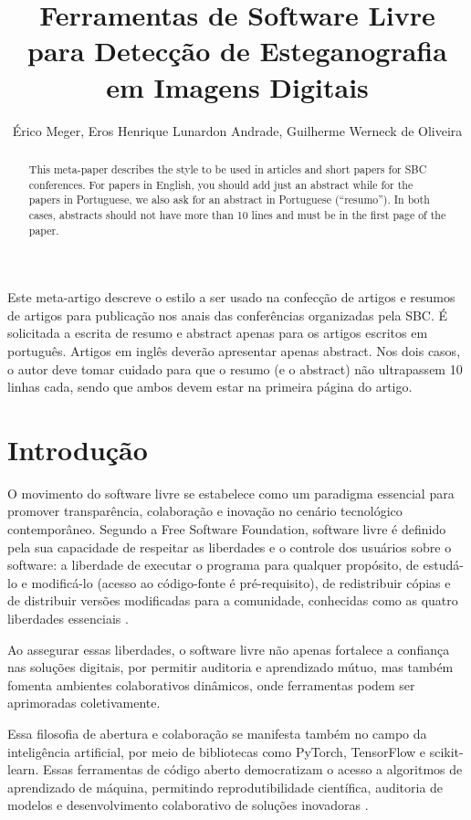 \documentclass[12pt]{article}
\title{Ferramentas de Software Livre para Detecção de Esteganografia em Imagens Digitais}
\author{Érico Meger\inst{1}, Eros Henrique Lunardon Andrade\inst{1}, Guilherme Werneck de Oliveira\inst{1}}
\begin{document}
\maketitle

\begin{abstract}
  This meta-paper describes the style to be used in articles and short papers
  for SBC conferences. For papers in English, you should add just an abstract
  while for the papers in Portuguese, we also ask for an abstract in
  Portuguese (``resumo''). In both cases, abstracts should not have more than
  10 lines and must be in the first page of the paper.
\end{abstract}

\begin{resumo}
  Este meta-artigo descreve o estilo a ser usado na confecção de artigos e
  resumos de artigos para publicação nos anais das conferências organizadas
  pela SBC. É solicitada a escrita de resumo e abstract apenas para os artigos
  escritos em português. Artigos em inglês deverão apresentar apenas abstract.
  Nos dois casos, o autor deve tomar cuidado para que o resumo (e o abstract)
  não ultrapassem 10 linhas cada, sendo que ambos devem estar na primeira
  página do artigo.
\end{resumo}

\section{Introdução}

O movimento do software livre se estabelece como um paradigma essencial para
promover transparência, colaboração e inovação no cenário tecnológico
contemporâneo. Segundo a Free Software Foundation, software livre é definido
pela sua capacidade de respeitar as liberdades e o controle dos usuários sobre
o software: a liberdade de executar o programa para qualquer propósito, de
estudá-lo e modificá-lo (acesso ao código-fonte é pré-requisito), de
redistribuir cópias e de distribuir versões modificadas para a comunidade,
conhecidas como as quatro liberdades essenciais \cite{gnu_freesw}.

Ao assegurar essas liberdades, o software livre não apenas fortalece a
confiança nas soluções digitais, por permitir auditoria e aprendizado mútuo,
mas também fomenta ambientes colaborativos dinâmicos, onde ferramentas podem
ser aprimoradas coletivamente. 



Essa filosofia de abertura e colaboração se
manifesta também no campo da inteligência artificial, por meio de bibliotecas
como PyTorch, TensorFlow e scikit-learn. Essas ferramentas de código aberto
democratizam o acesso a algoritmos de aprendizado de máquina, permitindo
reprodutibilidade científica, auditoria de modelos e desenvolvimento
colaborativo de soluções inovadoras \cite{pytorch_about, tensorflow_about}.
\end{document}
